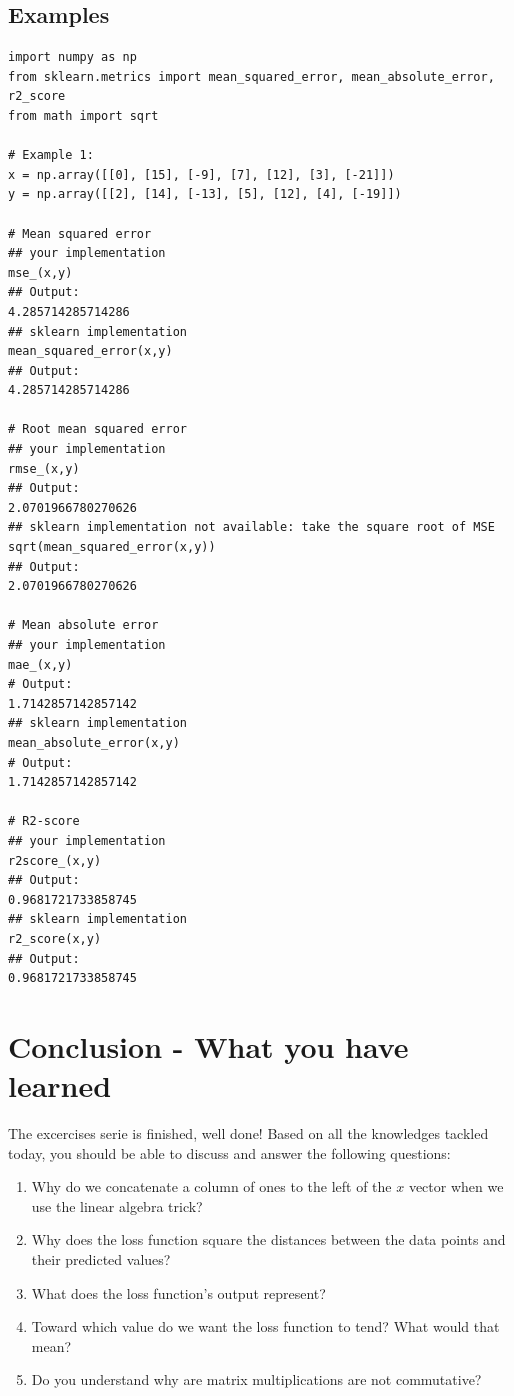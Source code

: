 \documentclass{42-en}
\begin{document}
\section*{Examples}
\begin{verbatim}
import numpy as np
from sklearn.metrics import mean_squared_error, mean_absolute_error, r2_score
from math import sqrt

# Example 1:
x = np.array([[0], [15], [-9], [7], [12], [3], [-21]])
y = np.array([[2], [14], [-13], [5], [12], [4], [-19]])

# Mean squared error
## your implementation
mse_(x,y)
## Output:
4.285714285714286
## sklearn implementation
mean_squared_error(x,y)
## Output:
4.285714285714286

# Root mean squared error
## your implementation
rmse_(x,y)
## Output:
2.0701966780270626
## sklearn implementation not available: take the square root of MSE
sqrt(mean_squared_error(x,y))
## Output:
2.0701966780270626

# Mean absolute error
## your implementation
mae_(x,y)
# Output:
1.7142857142857142
## sklearn implementation
mean_absolute_error(x,y)
# Output:
1.7142857142857142

# R2-score
## your implementation
r2score_(x,y)
## Output:
0.9681721733858745
## sklearn implementation
r2_score(x,y)
## Output:
0.9681721733858745
\end{verbatim}


\newpage

\chapter{Conclusion - What you have learned}

The excercises serie is finished, well done!
Based on all the knowledges tackled today, you should be able to discuss and answer the following questions:
\begin{enumerate}
  \item Why do we concatenate a column of ones to the left of the $x$ vector when we use the linear algebra trick?   
  
  \item Why does the loss function square the distances between the data points and their predicted values?
  
  \item What does the loss function's output represent?
  
  \item Toward which value do we want the loss function to tend? What would that mean? 
  
  \item Do you understand why are matrix multiplications are not commutative?
\end{enumerate}
\end{document}

